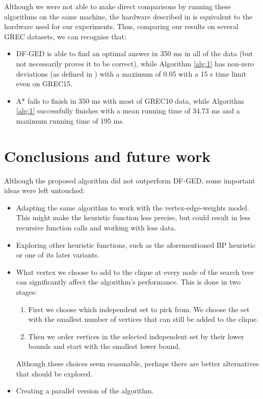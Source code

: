 \documentclass{article}
\theoremstyle{definition}
\begin{document}
Although we were not able to make direct comparisons by running these algorithms on the same machine, the hardware described in \cite{abu-aisheh_raveaux_ramel_martineau_2015} is equivalent to the hardware used for our experiments. Thus, comparing our results on several GREC datasets, we can recognise that:
\begin{itemize}
\item DF-GED is able to find an optimal answer in 350 ms in all of the data (but not necessarily proves it to be correct), while Algorithm \ref{alg:1} has non-zero deviations (as defined in \cite{abu-aisheh_raveaux_ramel_martineau_2015}) with a maximum of 0.05 with a 15 s time limit even on GREC15.
\item A* fails to finish in 350 ms with most of GREC10 data, while Algorithm \ref{alg:1} successfully finishes with a mean running time of 34.73 ms and a maximum running time of 195 ms.
\end{itemize}
\section{Conclusions and future work}
Although the proposed algorithm did not outperform DF-GED, some important ideas were left untouched:
\begin{itemize}
\item Adapting the same algorithm to work with the vertex-edge-weights model. This might make the heuristic function less precise, but could result in less recursive function calls and working with less data.
\item Exploring other heuristic functions, such as the aforementioned BP heuristic or one of its later variants.
\item What vertex we choose to add to the clique at every node of the search tree can significantly affect the algorithm's performance. This is done in two stages:
  \begin{enumerate}
  \item First we choose which independent set to pick from. We choose the set with the smallest number of vertices that can still be added to the clique.
  \item Then we order vertices in the selected independent set by their lower bounds and start with the smallest lower bound.
  \end{enumerate}
  Although these choices seem reasonable, perhaps there are better alternatives that should be explored.
\item Creating a parallel version of the algorithm.
\end{itemize}
\printbibliography
\end{document}
